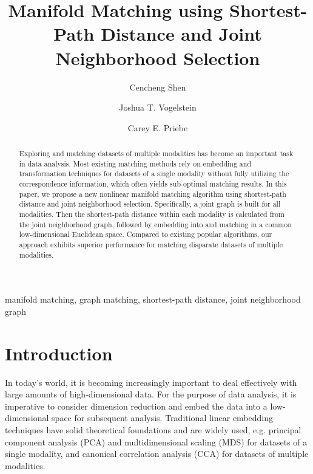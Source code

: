 \documentclass[times,twocolumn,final]{elsarticle}
\begin{document}
\begin{frontmatter}
\title{Manifold Matching using Shortest-Path Distance and Joint Neighborhood Selection}
\author[1,2]{Cencheng Shen}
\author[1,3]{Joshua T. Vogelstein}
\author[1,4]{Carey E. Priebe}

\address[1]{Center for Imaging Science, Johns Hopkins University}
\address[2]{Department of Statistics, Temple University}
\address[3]{Department of Biomedical Engineering and Institute for Computational Medicine, Johns Hopkins University}
\address[4]{Department of Applied Mathematics and Statistics, Johns Hopkins University}

\begin{abstract}
Exploring and matching datasets of multiple modalities has become an important task in data analysis. Most existing matching methods rely on embedding and transformation techniques for datasets of a single modality without fully utilizing the correspondence information, which often yields sub-optimal matching results. In this paper, we propose a new nonlinear manifold matching algorithm using shortest-path distance and joint neighborhood selection. Specifically, a joint graph is built for all modalities. Then the shortest-path distance within each modality is calculated from the joint neighborhood graph, followed by embedding into and matching in a common low-dimensional Euclidean space. Compared to existing popular algorithms, our approach exhibits superior performance for matching disparate datasets of multiple modalities. 
\end{abstract}
\begin{keyword}
manifold matching, graph matching, shortest-path distance, joint neighborhood graph
\end{keyword}
\end{frontmatter}

\section{Introduction}
In today's world, it is becoming increasingly important to deal effectively with large amounts of high-dimensional data. For the purpose of data analysis, it is imperative to consider dimension reduction and embed the data into a low-dimensional space for subsequent analysis. Traditional linear embedding techniques have solid theoretical foundations and are widely used, e.g. principal component analysis (PCA) \citep{JolliffePCABook, BishopTipping1999} and multidimensional scaling (MDS) \citep{TorgersonBook, BorgBook, CoxBook} for datasets of a single modality, and canonical correlation analysis (CCA) \citep{Hotelling1936, BachJordan2005} for datasets of multiple modalities. 
\end{document}
